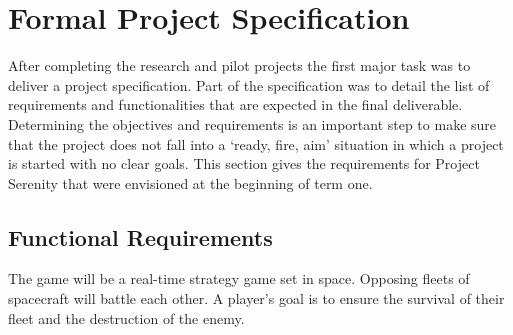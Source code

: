 \section{Formal Project Specification}
\label{sec:specv2}


After completing the research and pilot projects the first major task was to deliver
a project specification. Part of the specification was to detail the list of requirements
and functionalities that are expected in the final deliverable. Determining the objectives
and requirements is an important step to make sure that the project does not fall into
a `ready, fire, aim' situation in which a project is started with no clear goals.
This section gives the requirements for Project Serenity that were envisioned at the
beginning of term one.

\subsection{Functional Requirements}


The game will be a real-time strategy game set in space. Opposing fleets of spacecraft
will battle each other. A player's goal is to ensure the survival of their fleet and the destruction
of the enemy.

